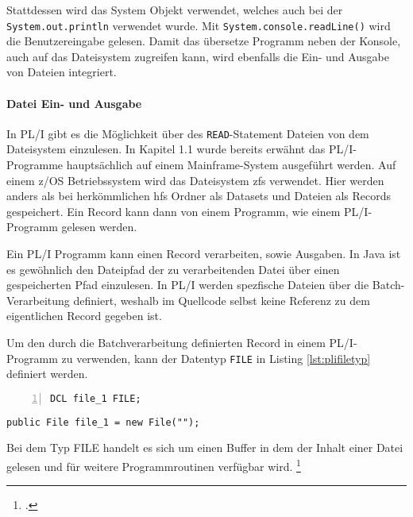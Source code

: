 Stattdessen wird das System Objekt verwendet, welches auch bei der \verb+System.out.println+ verwendet wurde.
Mit \verb+System.console.readLine()+ wird die Benutzereingabe gelesen.
Damit das übersetze Programm neben der Konsole, auch auf das Dateisystem zugreifen kann, wird ebenfalls die Ein- und Ausgabe von Dateien integriert.

\paragraph{Datei Ein- und Ausgabe}
In PL/I gibt es die Möglichkeit über des \verb+READ+-Statement Dateien von dem Dateisystem einzulesen.
In Kapitel 1.1 wurde bereits erwähnt das PL/I-Programme hauptsächlich auf einem Mainframe-System ausgeführt werden.
Auf einem z/OS Betriebssystem wird das Dateisystem \ac{zfs} verwendet.
Hier werden anders als bei herkömmlichen \ac{hfs} Ordner als Datasets und Dateien als Records gespeichert.
Ein Record kann dann von einem Programm, wie einem PL/I-Programm gelesen werden.

Ein PL/I Programm kann einen Record verarbeiten, sowie Ausgaben. In Java ist es gewöhnlich den Dateipfad der zu verarbeitenden Datei über einen gespeicherten Pfad einzulesen.
In PL/I werden spezfische Dateien über die Batch-Verarbeitung definiert, weshalb im Quellcode selbst keine Referenz zu dem eigentlichen Record gegeben ist.

Um den durch die Batchverarbeitung definierten Record in einem PL/I-Programm zu verwenden, kann der Datentyp \verb+FILE+ in Listing \ref{lst:plifiletyp} definiert werden.

\begin{minipage}[b]{0.5\linewidth}
	\centering
	\lstset{language=PL/I,label=SliceExaple}
	\begin{lstlisting}[frame=single, numbers=left, mathescape,%
		caption={Transformation deiner If-Else-Statements}, label={lst:plifiletyp}]
		DCL file_1 FILE;
	\end{lstlisting}
\end{minipage}
\hspace{0.5cm}
\begin{minipage}[b]{0.5\linewidth}
	\centering
	\lstset{language=Java,label=SliceExaple}
	\begin{lstlisting}[frame=single, mathescape,%
		title={}]
		public File file_1 = new File("");
	\end{lstlisting}
\end{minipage}  

Bei dem Typ FILE handelt es sich um einen Buffer in dem der Inhalt einer Datei gelesen und für weitere Programmroutinen verfügbar wird. \footcite[Vgl. ][ S.305ff. ]{pliref}

